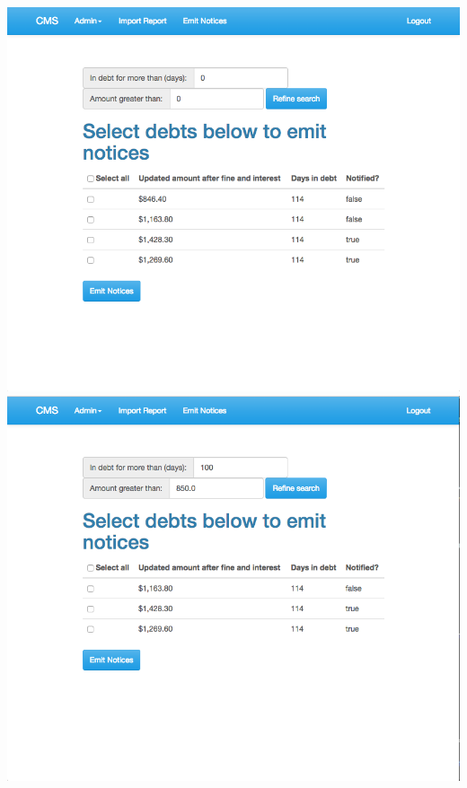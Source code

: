 \begin{itemize}
    \includegraphics[scale=0.25]{./images/ss/notice/2.png}\\
    \includegraphics[scale=0.25]{./images/ss/notice/3.png}

\end{itemize}
